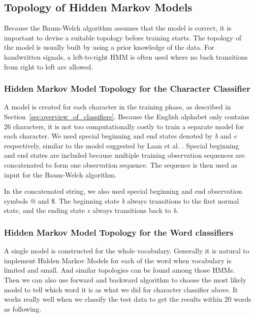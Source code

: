 
\subsection{Topology of Hidden Markov Models}

Because the Baum-Welch algorithm assumes that the model is correct, it is important to devise a suitable topology before training starts. 
The topology of the model is usually built by using a prior knowledge of the data. 
For handwritten signals, a left-to-right HMM is often used where no back transitions from right to left are allowed. \cite{Suen}

\subsubsection{Hidden Markov Model Topology for the Character Classifier}
A model is created for each character in the training phase, as described in Section~\ref{sec:overview_of_classifiers}. Because the English alphabet only contains 26 characters, it is not too computationally costly to train a separate model for each character.
We used special beginning and end states denoted by \textit{b} and \textit{e} respectively, similar to the model suggested by Laan et al. \cite{Laan}.
Special beginning and end states are included because multiple training observation sequences are concatenated to form one observation sequence.
The sequence is then used as input for the Baum-Welch algorithm.

In the concatenated string, we also used special beginning and end observation symbols @ and \$.
The  beginning state \textit{b} always transitions to the first normal state, and the  ending state \textit{e} always transitions back to \textit{b}.



\subsubsection{Hidden Markov Model Topology for the Word classifiers}


A single model is constructed for the whole vocabulary. Generally it is natural to implement Hidden Markov Models for each of the word when vocabulary is limited and small. And similar topologies can be found among those HMMs. Then we can also use forward and backward algorithm to choose the most likely model to tell which word it is as what we did for character classifier above. It works really well when we classify the test data to get the results within 20 words as following.

